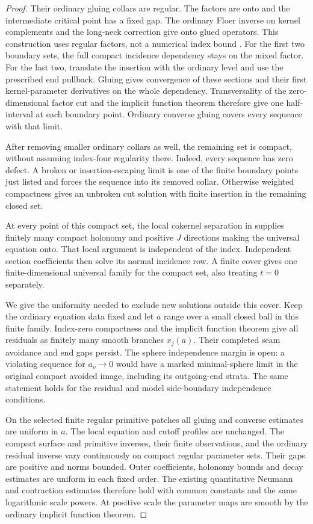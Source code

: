 \documentclass[11pt]{amsart}
\theoremstyle{definition}
\theoremstyle{remark}
\theoremstyle{plain}
\begin{document}
\begin{proof}
Their ordinary gluing collars are regular.
The factors are onto and the intermediate
critical point has a fixed gap.
The ordinary Floer inverse on kernel
complements and the long-neck correction
give onto glued operators.
This construction uses regular factors,
not a numerical index bound
\cite[Section~5.4 and Proposition~7.12]{DaeFukLip21a}.
For the first two boundary sets, the full
compact incidence dependency stays on
the mixed factor. For the last two,
translate the insertion with the
ordinary level and use the prescribed
end pullback. Gluing gives convergence
of these sections and their first
kernel-parameter derivatives on the
whole dependency. Transversality of
the zero-dimensional factor cut and
the implicit function theorem therefore
give one half-interval at each boundary
point. Ordinary converse gluing covers
every sequence with that limit.

After removing smaller ordinary collars
as well, the remaining set is compact,
without assuming index-four regularity
there. Indeed, every sequence has zero
defect. A broken or insertion-escaping
limit is one of the finite boundary
points just listed and forces the
sequence into its removed collar.
Otherwise weighted compactness gives
an unbroken cut solution with finite
insertion in the remaining closed set.

At every point of this compact set,
the local cokernel separation in
\cite[Section~6.2, pp.~82--83]{DaeFukLip21a}
supplies finitely many compact holonomy
and positive $J$ directions making
the universal equation onto. That
local argument is independent of
the index. Independent section
coefficients then solve its normal
incidence row. A finite cover gives
one finite-dimensional universal
family for the compact set, also
treating $t=0$ separately.

We give the uniformity needed to
exclude new solutions outside this
cover. Keep the ordinary equation
data fixed and let $a$ range over
a small closed ball in this finite
family. Index-zero compactness and
the implicit function theorem give
all residuals as finitely many
smooth branches $x_j(a)$.
Their completed seam avoidance and
end gaps persist.
The sphere independence margin is
open: a violating sequence for
$a_\nu\to0$ would have a marked
minimal-sphere limit in the original
compact avoided image, including
its outgoing-end strata.
The same statement holds for the
residual and model side-boundary
independence conditions.

On the selected finite regular
primitive patches all gluing and
converse estimates are uniform in
$a$. The local equation and cutoff
profiles are unchanged. The compact
surface and primitive inverses,
their finite observations, and
the ordinary residual inverse
vary continuously on compact
regular parameter sets.
Their gaps are positive and norms
bounded. Outer coefficients,
holonomy bounds and decay estimates
are uniform in each fixed order.
The existing quantitative Neumann
and contraction estimates therefore
hold with common constants and
the same logarithmic scale powers.
At positive scale the parameter
maps are smooth by the ordinary
implicit function theorem.


\end{proof}
\end{document}
